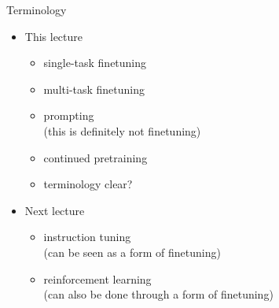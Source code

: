 \documentclass[11pt,compress,t,notes=noshow, xcolor=table]{beamer}
\begin{document}
\begin{frame}{Terminology}

\vfill

\begin{itemize}
  \item This lecture
\begin{itemize}
\item single-task finetuning
\item multi-task finetuning
\item prompting\\
(this is definitely not finetuning)
\item continued pretraining
\item \ques terminology clear?
\end{itemize}
\item Next lecture
  \begin{itemize}
\item instruction tuning\\ (can be seen as a form of finetuning)
\item reinforcement learning\\
  (can also be done through a form of finetuning)
\end{itemize}
\end{itemize}

\vfill

\end{frame}





%
%	
%
%

\end{document}
